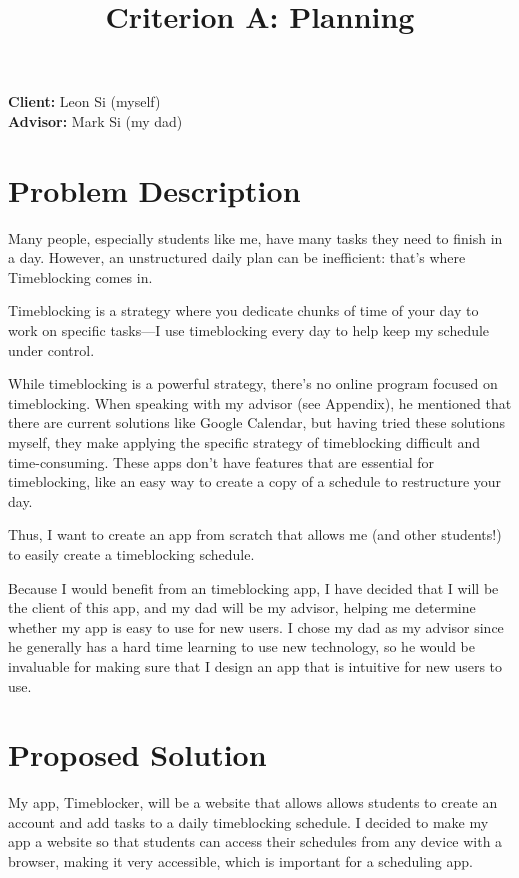 \documentclass[12pt, notitlepage]{article}
\title{Criterion A: Planning}
\begin{document}
\centerline{\textcolor{msblue}{
		\textbf{\fontsize{13}{13}\MyTitle}
	}}

\noindent\textbf{Client:} Leon Si (myself)
\\
\textbf{Advisor:} Mark Si (my dad)

\section{Problem Description}
Many people, especially students like me, have many tasks they need to finish in a day. However, an unstructured daily plan can be inefficient: that's where Timeblocking comes in.

Timeblocking is a strategy where you dedicate chunks of time of your day to work on specific tasks—I use timeblocking every day to help keep my schedule under control.

While timeblocking is a powerful strategy, there's no online program focused on timeblocking. When speaking with my advisor (see Appendix), he mentioned that there are current solutions like Google Calendar, but having tried these solutions myself, they make applying the specific strategy of timeblocking difficult and time-consuming. These apps don't have features that are essential for timeblocking, like an easy way to create a copy of a schedule to restructure your day.

Thus, I want to create an app from scratch that allows me (and other students!) to easily create a timeblocking schedule.

Because I would benefit from an timeblocking app, I have decided that I will be the client of this app, and my dad will be my advisor, helping me determine whether my app is easy to use for new users. I chose my dad as my advisor since he generally has a hard time learning to use new technology, so he would be invaluable for making sure that I design an app that is intuitive for new users to use.

\bigskip
{}

\section{Proposed Solution}
My app, Timeblocker, will be a website that allows allows students to create an account and add tasks to a daily timeblocking schedule. I decided to make my app a website so that students can access their schedules from any device with a browser, making it very accessible, which is important for a scheduling app.
\end{document}
